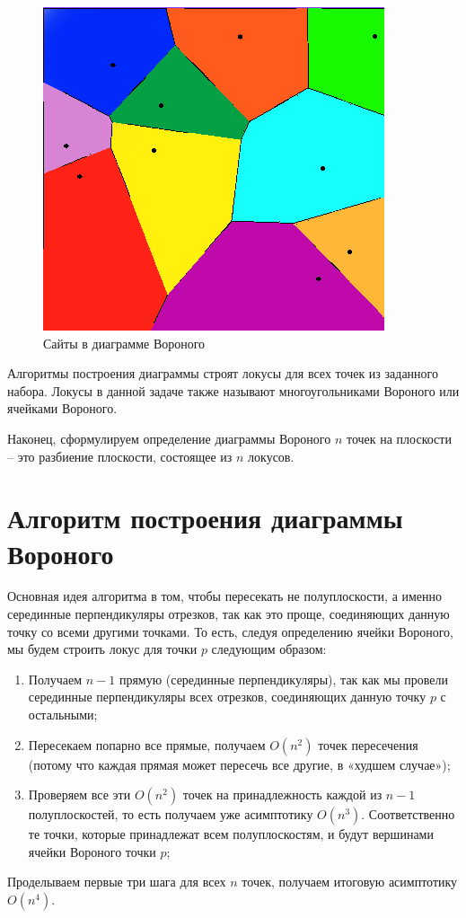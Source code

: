 \begin{figure}[h]
	\centering\includegraphics[width=0.4\linewidth]{img/sites}
	\caption{Сайты в диаграмме Вороного}
	\label{fig:sites}
\end{figure}

Алгоритмы построения диаграммы строят локусы для всех точек из заданного набора. Локусы в данной задаче также называют многоугольниками Вороного или ячейками Вороного. 

Наконец, сформулируем определение диаграммы Вороного $n$ точек на плоскости -- это разбиение плоскости, состоящее из $n$ локусов. 

\section{Алгоритм построения диаграммы Вороного}
Основная идея алгоритма в том, чтобы пересекать не полуплоскости, а именно серединные перпендикуляры отрезков, так как это проще, соединяющих данную точку со всеми другими точками. То есть, следуя определению ячейки Вороного, мы будем строить локус для точки $p$ следующим образом:

\begin{enumerate}
	\item Получаем $n-1$ прямую (серединные перпендикуляры), так как мы провели серединные перпендикуляры всех отрезков, соединяющих данную точку $p$ с остальными;
	\item Пересекаем попарно все прямые, получаем $O(n^2)$ точек пересечения (потому что каждая прямая может пересечь все другие, в «худшем случае»);
	\item Проверяем все эти $O(n^2)$ точек на принадлежность каждой из $n-1$ полуплоскостей, то есть получаем уже асимптотику $O(n^3)$. Соответственно те точки, которые принадлежат всем полуплоскостям, и будут вершинами ячейки Вороного точки $p$;
\end{enumerate}

Проделываем первые три шага для всех $n$ точек, получаем итоговую асимптотику $O(n^4)$.
\newpage